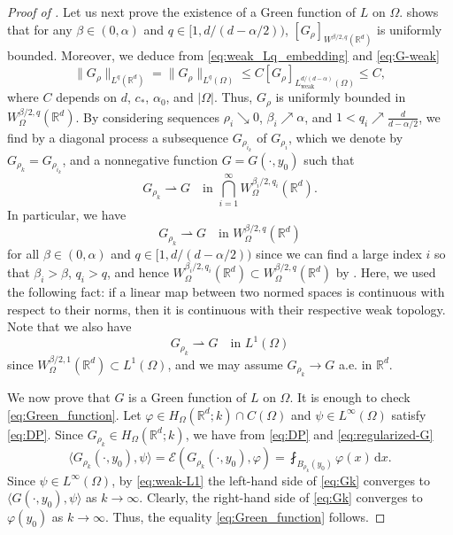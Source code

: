 \documentclass[reqno]{amsart}
\theoremstyle{plain}
\theoremstyle{definition}
\numberwithin{equation}{section}
\newcommand{\Rd}{\mathbb{R}^d}
\newcommand{\dx} {\, \mathrm{d}x}
\newcommand{\cl} {c_{\ast}}
\begin{document}
\begin{proof} [Proof of ]
Let us next prove the existence of a Green function of $L$ on $\Omega$.  shows that for any $\beta \in (0,\alpha)$ and $q \in [1, d/(d-\alpha/2))$, $[G_{\rho}]_{W^{\beta/2,q}(\Rd)}$ is uniformly bounded. Moreover, we deduce from \eqref{eq:weak_Lq_embedding} and \eqref{eq:G-weak}
\begin{equation*}
\|G_{\rho}\|_{L^{q}(\Rd)} = \|G_{\rho}\|_{L^{q}(\Omega)} \leq C [G_{\rho}]_{L^{d/(d-\alpha)}_{\mathrm{weak}}(\Omega)} \leq C,
\end{equation*}
where $C$ depends on $d$, $\cl$, $\alpha_{0}$, and $|\Omega|$. Thus, $G_{\rho}$ is uniformly bounded in $W^{\beta/2,q}_{\Omega}(\Rd)$. By considering sequences $\rho_{i} \searrow 0$, $\beta_{i} \nearrow \alpha$, and $1< q_{i} \nearrow \frac{d}{d-\alpha/2}$, we find by a diagonal process a subsequence $G_{\rho_{i_{k}}}$ of $G_{\rho_{i}}$, which we denote by $G_{\rho_{k}}=G_{\rho_{i_{k}}}$, and a nonnegative function $G = G(\cdot, y_{0})$ such that
\begin{equation*}
G_{\rho_{k}} \rightharpoonup G \quad \text{in } \bigcap_{i=1}^{\infty} W^{\beta_{i}/2, q_{i}}_{\Omega}(\Rd).
\end{equation*}
In particular, we have
\begin{equation*}
G_{\rho_{k}} \rightharpoonup G \quad \text{in } W^{\beta/2, q}_{\Omega}(\Rd)
\end{equation*}
for all $\beta \in (0,\alpha)$ and $q \in [1, d/(d-\alpha/2))$ since we can find a large index $i$ so that $\beta_{i} > \beta$, $q_{i} > q$, and hence $W^{\beta_{i}/2, q_{i}}_{\Omega}(\Rd) \subset W^{\beta/2, q}_{\Omega}(\Rd)$ by . Here, we used the following fact: if a linear map between two normed spaces is continuous with respect to their norms, then it is continuous with their respective weak topology. Note that we also have
\begin{equation} \label{eq:weak-L1}
G_{\rho_{k}} \rightharpoonup G \quad \text{in } L^{1}(\Omega)
\end{equation}
since $W^{\beta/2,1}_{\Omega}(\Rd) \subset L^{1}(\Omega)$, and we may assume $G_{\rho_{k}} \to G$ a.e. in $\Rd$.

We now prove that $G$ is a Green function of $L$ on $\Omega$. It is enough to check \eqref{eq:Green_function}. Let $\varphi \in H_{\Omega}(\Rd;k) \cap C(\Omega)$ and $\psi \in L^{\infty}(\Omega)$ satisfy \eqref{eq:DP}. Since $G_{\rho_{k}} \in H_{\Omega}(\Rd;k)$, we have from \eqref{eq:DP} and \eqref{eq:regularized-G}
\begin{equation} \label{eq:Gk}
\langle G_{\rho_{k}}(\cdot, y_{0}), \psi \rangle = \mathcal{E}(G_{\rho_{k}}(\cdot, y_{0}), \varphi) = \fint_{B_{\rho_{k}}(y_{0})} \varphi(x) \dx.
\end{equation}
Since $\psi \in L^{\infty}(\Omega)$, by \eqref{eq:weak-L1} the left-hand side of \eqref{eq:Gk} converges to $\langle G(\cdot, y_{0}), \psi \rangle$ as $k \to \infty$. Clearly, the right-hand side of \eqref{eq:Gk} converges to $\varphi(y_{0})$ as $k \to \infty$. Thus, the equality \eqref{eq:Green_function} follows.


\end{proof}
\end{document}
